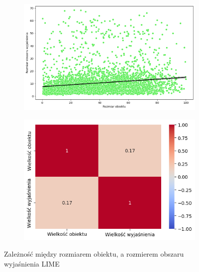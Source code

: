 \begin{figure}[h]
	\centering
	\begin{subfigure}[b]{0.45\textwidth}
		\includegraphics[width=.9\textwidth]{img/size_exp_lime}
	\end{subfigure}
	\begin{subfigure}[b]{0.45\textwidth}
		\includegraphics[width=.9\textwidth]{img/size_exp_lime_corr}
	\end{subfigure}
	\caption{Zależność między rozmiarem obiektu, a rozmierem obszaru wyjaśnienia LIME}
\end{figure}

